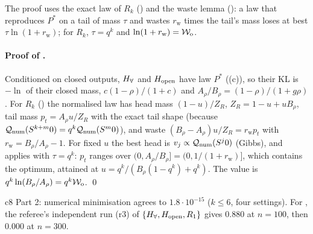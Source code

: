 \noindent The proof uses the exact law of $R_k$ () and the waste lemma (): a law that reproduces $P^*$ on a tail of mass $\tau$ and wastes $r_{\mathrm w}$ times the tail's mass loses at best $\tau\ln(1+r_{\mathrm w})$; for $R_k$, $\tau=q^k$ and $\ln(1+r_{\mathrm w})=\mathcal{W}_{\mathrm{o}}$.

\paragraph{Proof of .} Conditioned on closed outputs, $H_{\forall}$ and $H_{\mathrm{open}}$ have law $P^*$ ((c)), so their KL is $-\ln$ of their closed mass, $c(1-\rho)/(1+c)$ and $A_\rho/B_\rho=(1-\rho)/(1+g\rho)$. For $R_k$ () the normalised law has head mass $(1-u)/Z_R$, $Z_R=1-u+uB_\rho$, tail mass $p_t=A_\rho u/Z_R$ with the exact tail shape (because $\mathcal{Q}_{\mathrm{num}}(S^{k+m}0)=q^k\mathcal{Q}_{\mathrm{num}}(S^m0)$), and waste $(B_\rho-A_\rho)u/Z_R=r_{\mathrm w}p_t$ with $r_{\mathrm w}=B_\rho/A_\rho-1$. For fixed $u$ the best head is $v_j\propto\mathcal{Q}_{\mathrm{num}}(S^j0)$ (Gibbs), and  applies with $\tau=q^k$: $p_t$ ranges over $(0,A_\rho/B_\rho]=(0,1/(1+r_{\mathrm w})]$, which contains the optimum, attained at $u=q^k/(B_\rho(1-q^k)+q^k)$. The value is $q^k\ln(B_\rho/A_\rho)=q^k\mathcal{W}_{\mathrm{o}}$. \qed

c8 Part 2: numerical minimisation agrees to $1.8\cdot10^{-15}$ ($k\le6$, four settings). For , the referee's independent run (r3) of $\{H_{\forall},H_{\mathrm{open}},R_1\}$ gives $0.880$ at $n=100$, then $0.000$ at $n=300$.

